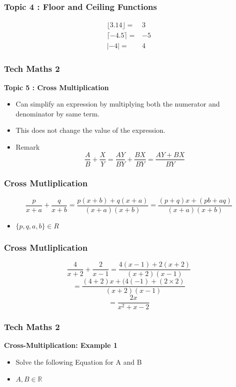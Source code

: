 \begin{itemize}
\begin{frame}
	
\end{frame}
\begin{frame}
	\frametitle{Topic 4 : Floor and Ceiling Functions}
	{
		\LARGE
		\begin{eqnarray}
		\lfloor 3.14 \rfloor =& 3 \\
		\lceil -4.5 \rceil =& -5 \\
		| -4 | =&  4
		\end{eqnarray}
	}
\end{frame}
\begin{frame}
	\frametitle{Tech Maths 2}
	\textbf{Topic 5 : Cross Multiplication}
	\Large 
	\begin{itemize}
		\item Can simplify an expression by multiplying both the numerator and denominator by same term.
		\item This does not change the value of the expression.
		\item Remark
		{
			\LARGE
		\[ \frac{A}{B} + \frac{X}{Y} = \frac{AY}{BY} + \frac{BX}{BY} = \frac{AY+BX}{BY}\]
	}
	\end{itemize}
\end{frame}



\begin{frame}
	\frametitle{Cross Mutliplication}
	\Large
	\[  \frac{p}{x+a} + \frac{q}{x+b}   = \frac{p(x+b) + q(x+a)}{(x+a)(x+b)} = \frac{(p+q)x+ (pb+aq)}{(x+a)(x+b)} \]
	
	\begin{itemize}
		\item $\{p,q,a,b\} \in R$
	\end{itemize}
	
\end{frame}
\begin{frame}
	\frametitle{Cross Mutliplication}
	\Large
	\[  \frac{4}{x+2} + \frac{2}{x-1}   = \frac{4(x-1) + 2(x+2)}{(x+2)(x-1)} \]
	\[ = \frac{(4+2)x + (4(-1)+(2\times 2)}{(x+2)(x-1)} \]
	\[ = \frac{2x}{x^2+x-2}\]
	
	\end{frame}
	\begin{frame}
	\frametitle{Tech Maths 2}
	\textbf{Cross-Multiplication: Example 1}
	\begin{itemize}
	\item Solve the following Equation for A and B
	\item $A,B \in \mathbb{R}$
	\end{itemize}
	

\end{frame}
\end{itemize}
